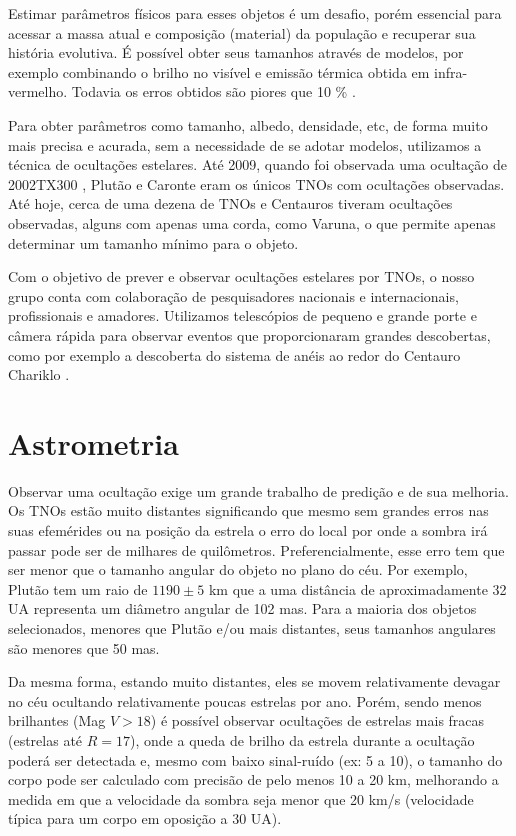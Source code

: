 \documentclass[12pt,a4paper]{monografia}
\begin{document}
Estimar parâmetros físicos para esses objetos é um desafio, porém essencial para acessar a massa atual e composição (material) da população e recuperar sua história evolutiva. É possível obter seus tamanhos através de modelos, por exemplo combinando o brilho no visível e emissão térmica obtida em infra-vermelho. Todavia os erros obtidos são piores que 10 \% \citep{Camargo2013}.

Para obter parâmetros como tamanho, albedo, densidade, etc, de forma muito mais precisa e acurada, sem a necessidade de se adotar modelos, utilizamos a técnica de ocultações estelares. Até 2009, quando foi observada uma ocultação de 2002TX300 \citep{Elliot2010}, Plutão e Caronte eram os únicos TNOs com ocultações observadas. Até hoje, cerca de uma dezena de TNOs e Centauros tiveram ocultações observadas, alguns com apenas uma corda, como Varuna, o que permite apenas determinar um tamanho mínimo para o objeto.

Com o objetivo de prever e observar ocultações estelares por TNOs, o nosso grupo conta com colaboração de pesquisadores nacionais e internacionais, profissionais e amadores. Utilizamos telescópios de pequeno e grande porte e câmera rápida para observar eventos que proporcionaram grandes descobertas, como por exemplo a descoberta do sistema de anéis ao redor do Centauro Chariklo \citep{BragaRibas2014}.



\section{Astrometria}
\label{Sec: TNOs-astrometria}

\indent \indent Observar uma ocultação exige um grande trabalho de predição e de sua melhoria. Os TNOs estão muito distantes significando que mesmo sem grandes erros nas suas efemérides ou na posição da estrela o erro do local por onde a sombra irá passar pode ser de milhares de quilômetros. Preferencialmente, esse erro tem que ser menor que o tamanho angular do objeto no plano do céu. Por exemplo, Plutão tem um raio de $1190 \pm 5$ km \cite[submetido]{DiasOliveira2015} que a uma distância de aproximadamente 32 UA representa um diâmetro angular de 102 mas. Para a maioria dos objetos selecionados, menores que Plutão e/ou mais distantes, seus tamanhos angulares são menores que 50 mas.

Da mesma forma, estando muito distantes, eles se movem relativamente devagar no céu ocultando relativamente poucas estrelas por ano. Porém, sendo menos brilhantes (Mag $V > 18$) é possível observar ocultações de estrelas mais fracas (estrelas até $R = 17$), onde a queda de brilho da estrela durante a ocultação poderá ser detectada e, mesmo com baixo sinal-ruído (ex: 5 a 10), o tamanho do corpo pode ser calculado com precisão de pelo menos 10 a 20 km, melhorando a medida em que a velocidade da sombra seja menor que 20 km/s (velocidade típica para um corpo em oposição a 30 UA).
\end{document}

